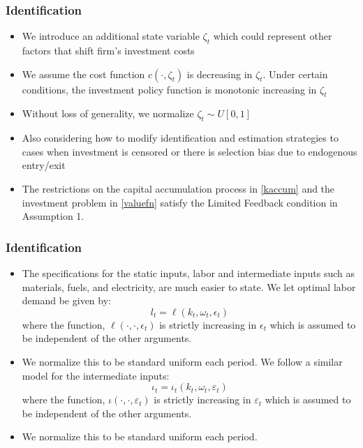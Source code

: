 \documentclass{beamer}
\begin{document}
\begin{frame}
\frametitle{Identification}
\begin{itemize}
\item We introduce an additional state variable $\zeta_{t}$ which could represent other factors that shift firm's investment costs
\item We assume the cost function $c(\cdot, \zeta_{t})$ is decreasing in $\zeta_{t}$. Under certain conditions, the investment policy function is monotonic increasing in $\zeta_{t}$
\item Without loss of generality, we normalize $\zeta_{t}\sim U[0,1]$
\item Also considering how to modify identification and estimation strategies to cases when investment is censored or there is selection bias due to endogenous entry/exit
\item The restrictions on the capital accumulation process in \eqref{kaccum} and the investment problem in \eqref{valuefn} satisfy the Limited Feedback condition in Assumption 1.
\end{itemize}
\end{frame}

\begin{frame}
\frametitle{Identification}
\begin{itemize}
\item The specifications for the static inputs, labor and intermediate inputs such as materials, fuels, and electricity, are much easier to state. We let optimal labor demand be given by:
\begin{equation} \label{labordemand}
l_{t}=\ell(k_{t}, \omega_{t}, \epsilon_{t})
\end{equation}
where the function, $\ell(\cdot, \cdot, \epsilon_{t})$ is strictly increasing in $\epsilon_{t}$ which is assumed to be independent of the other arguments. 
\item We normalize this to be standard uniform each period. We follow a similar model for the intermediate inputs:
\begin{equation} \label{intdemand}
\iota_{t}=\iota_{t}(k_{t}, \omega_{t}, \varepsilon_{t})
\end{equation}
where the function, $\iota(\cdot, \cdot, \varepsilon_{t})$ is strictly increasing in $\varepsilon_{t}$ which is assumed to be independent of the other arguments. 
\item We normalize this to be standard uniform each period.
\end{itemize}
\end{frame}
\end{document}
